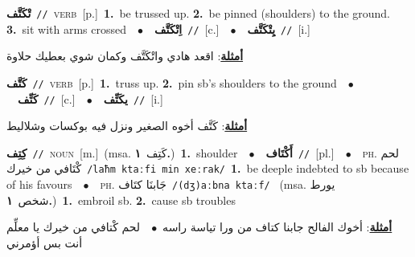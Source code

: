 \documentclass[10pt,a4paper,twoside]{article} %
\begin{document}
\begin{multicols}{2}
{\setlength\topsep{0pt}\textbf{\foreignlanguage{arabic}{تْكَتَّف}}\ {\color{gray}\texttt{//}\color{black}}\ \textsc{verb}\ [p.]\ \textbf{1.}~be trussed up.  \textbf{2.}~be pinned (shoulders) to the ground.  \textbf{3.}~sit with arms crossed\ \ $\bullet$\ \ \setlength\topsep{0pt}\textbf{\foreignlanguage{arabic}{اِتْكَتَّف}}\ {\color{gray}\texttt{//}\color{black}}\ [c.]\ \ $\bullet$\ \ \setlength\topsep{0pt}\textbf{\foreignlanguage{arabic}{يِتْكَتَّف}}\ {\color{gray}\texttt{//}\color{black}}\ [i.]\  \begin{flushright}\color{gray}\foreignlanguage{arabic}{\textbf{\underline{\foreignlanguage{arabic}{أمثلة}}}: اقعد هادي واتْكَتَّف وكمان شوي بعطيك حلاوة}\end{flushright}\color{black}} \vspace{2mm}

{\setlength\topsep{0pt}\textbf{\foreignlanguage{arabic}{كَتَّف}}\ {\color{gray}\texttt{//}\color{black}}\ \textsc{verb}\ [p.]\ \textbf{1.}~truss up.  \textbf{2.}~pin sb's shoulders to the ground\ \ $\bullet$\ \ \setlength\topsep{0pt}\textbf{\foreignlanguage{arabic}{كَتِّف}}\ {\color{gray}\texttt{//}\color{black}}\ [c.]\ \ $\bullet$\ \ \setlength\topsep{0pt}\textbf{\foreignlanguage{arabic}{يكَتِّف}}\ {\color{gray}\texttt{//}\color{black}}\ [i.]\  \begin{flushright}\color{gray}\foreignlanguage{arabic}{\textbf{\underline{\foreignlanguage{arabic}{أمثلة}}}: كَتَّف أخوه الصغير ونزل فيه بوكسات وشلاليط}\end{flushright}\color{black}} \vspace{2mm}

{\setlength\topsep{0pt}\textbf{\foreignlanguage{arabic}{كِتِف}}\ {\color{gray}\texttt{//}\color{black}}\ \textsc{noun}\ [m.]\ \color{gray}(msa. \foreignlanguage{arabic}{كَتِف}~\foreignlanguage{arabic}{\textbf{١.}})\color{black}\ \textbf{1.}~shoulder\ \ $\bullet$\ \ \setlength\topsep{0pt}\textbf{\foreignlanguage{arabic}{أَكْتَاف}}\ {\color{gray}\texttt{//}\color{black}}\ [pl.]\ \ $\bullet$\ \ \textsc{ph.} \color{gray} \foreignlanguage{arabic}{لحم كْتَافي من خيرك}\color{black}\ {\color{gray}\texttt{/{\sffamily laħm ktaːfi min xeːrak}/}\color{black}}\ \textbf{1.}~be deeple indebted to sb because of his favours\ \ $\bullet$\ \ \textsc{ph.} \color{gray} \foreignlanguage{arabic}{جَابنَا كتَاف}\color{black}\ {\color{gray}\texttt{/{\sffamily (dʒ)aːbna ktaːf}/}\color{black}}\ \color{gray} (msa. \foreignlanguage{arabic}{يورط شخص}~\foreignlanguage{arabic}{\textbf{١.}})\color{black}\ \textbf{1.}~embroil sb.  \textbf{2.}~cause sb troubles\  \begin{flushright}\color{gray}\foreignlanguage{arabic}{\textbf{\underline{\foreignlanguage{arabic}{أمثلة}}}: أخوك الفالح جابنا كتاف من ورا تياسة راسه\ $\bullet$\ \  لحم كْتافي من خيرك يا معلِّم أنت بس أؤمرني}\end{flushright}\color{black}} \vspace{2mm}


\end{multicols}
\end{document}
